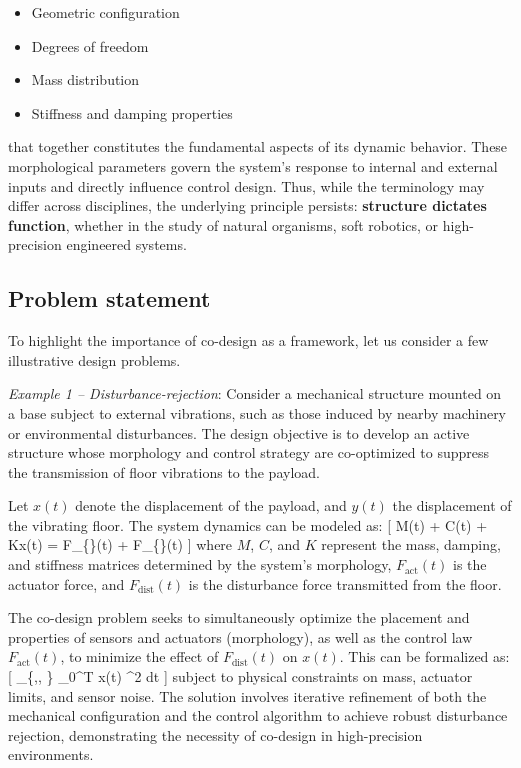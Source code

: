 \begin{itemize}
  \item Geometric configuration
  \item Degrees of freedom
  \item Mass distribution
  \item Stiffness and damping properties
\end{itemize}

\noindent that together constitutes the fundamental aspects of its
dynamic behavior. These morphological parameters govern the system's
response to internal and external inputs and directly influence control
design. Thus, while the terminology may differ across disciplines, the
underlying principle persists: \textbf{structure dictates function},
whether in the study of natural organisms, soft robotics, or
high-precision engineered systems.

\hypertarget{problem-statement}{%
\subsection{Problem statement}\label{problem-statement}}

To highlight the importance of co-design as a framework, let us consider
a few illustrative design problems.

\emph{Example 1 -- Disturbance-rejection}: Consider a mechanical
structure mounted on a base subject to external vibrations, such as
those induced by nearby machinery or environmental disturbances. The
design objective is to develop an active structure whose morphology and
control strategy are co-optimized to suppress the transmission of floor
vibrations to the payload.

Let \(x(t)\) denote the displacement of the payload, and \(y(t)\) the
displacement of the vibrating floor. The system dynamics can be modeled
as: {[} M(t) + C(t) + Kx(t) = F\_\{\}(t) +
F\_\{\}(t) {]} where \(M\), \(C\), and \(K\) represent the
mass, damping, and stiffness matrices determined by the system's
morphology, \(F_{\text{act}}(t)\) is the actuator force, and
\(F_{\text{dist}}(t)\) is the disturbance force transmitted from the
floor.

The co-design problem seeks to simultaneously optimize the placement and
properties of sensors and actuators (morphology), as well as the control
law \(F_{\text{act}}(t)\), to minimize the effect of
\(F_{\text{dist}}(t)\) on \(x(t)\). This can be formalized as: {[}
\min\_\{,, \} \int\_0\^{}T
\left\textbar{} x(t) \right\textbar\^{}2 dt {]} subject to physical
constraints on mass, actuator limits, and sensor noise. The solution
involves iterative refinement of both the mechanical configuration and
the control algorithm to achieve robust disturbance rejection,
demonstrating the necessity of co-design in high-precision environments.

